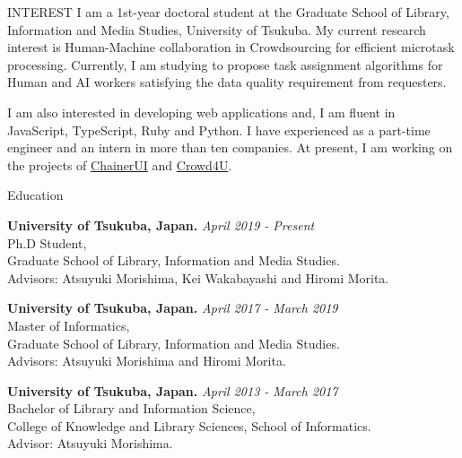 \documentclass{resume} %
\begin{document}
\begin{rSection}{INTEREST}
I am a 1st-year doctoral student at the Graduate School of Library, Information and Media Studies, University of Tsukuba.
My current research interest is Human-Machine collaboration in Crowdsourcing for efficient microtask processing.
Currently, I am studying to propose task assignment algorithms for Human and AI workers satisfying the data quality requirement from requesters.
  
I am also interested in developing web applications and, I am fluent in JavaScript, TypeScript, Ruby and Python.
I have experienced as a part-time engineer and an intern in more than ten companies.
At present, I am working on the projects of \href{https://github.com/chainer/chainerui}{ChainerUI} and \href{http://crowd4u.org}{Crowd4U}.
  


\end{rSection}


\begin{rSection}{Education}

{\bf University of Tsukuba, Japan. } \hfill {\em April 2019 - Present}
\\ Ph.D Student,
\\ Graduate School of Library, Information and Media Studies.
\\ Advisors: Atsuyuki Morishima, Kei Wakabayashi and Hiromi Morita.

{\bf University of Tsukuba, Japan. } \hfill {\em April 2017 - March 2019}
\\ Master of Informatics,
\\ Graduate School of Library, Information and Media Studies.
\\ Advisors: Atsuyuki Morishima and Hiromi Morita.

{\bf University of Tsukuba, Japan. } \hfill {\em April 2013 - March 2017} 
\\ Bachelor of Library and Information Science,
\\ College of Knowledge and Library Sciences, School of Informatics.
\\ Advisor: Atsuyuki Morishima.
\end{rSection}
\end{document}
